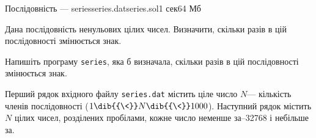 \begin{problem}{Послідовність --- series}{series.dat}{series.sol}{1 сек}{64 Мб}

Дана послідовність ненульових цілих чисел. Визначити, скільки разів в цій послідовності змінюється знак.

\Task 
Напишіть програму \texttt{series}, яка б визначала, скільки разів в цій послідовності змінюється знак.

\InputFile
Перший рядок вхідного файлу \texttt{series.dat} містить ціле число $N$\nolinebreak[3] --- кількість членів послідовності ($1\dib{{\<}}N\dib{{\<}}1000$). Наступний рядок містить $N$ цілих чисел, розділених пробілами, кожне число не\nolinebreak[3] менше за\nolinebreak[3] --32768 і не\nolinebreak[3] більше за.

\ifBigStretch
\vspace{-0.25\baselineskip}
\fi

\Example
\begin{exampleWidthsAndDefaultFileNames}{7em}{4em}
%
\end{exampleWidthsAndDefaultFileNames}

\end{problem}

